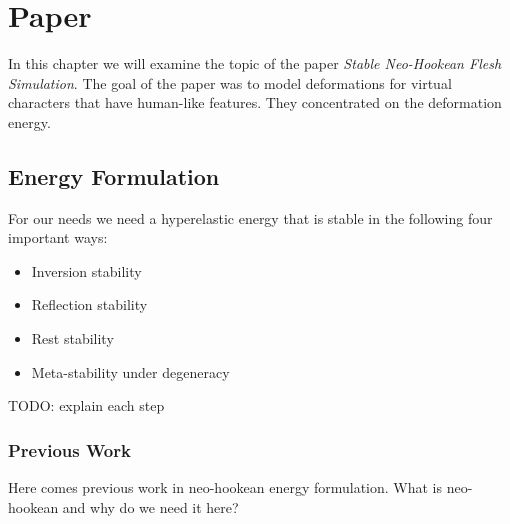 \chapter{Paper} \label{c:Paper}
In this chapter we will examine the topic of the paper \textit{Stable Neo-Hookean Flesh Simulation}. The goal of the paper was to model deformations for virtual characters that have human-like features. They concentrated on the deformation energy.

\section{Energy Formulation}

For our needs we need a hyperelastic energy that is stable in the following four important ways:

\begin{itemize}
\item Inversion stability
\item Reflection stability
\item Rest stability
\item Meta-stability under degeneracy
\end{itemize}

TODO: explain each step

\subsection{Previous Work}
Here comes previous work in neo-hookean energy formulation. What is neo-hookean and why do we need it here?
